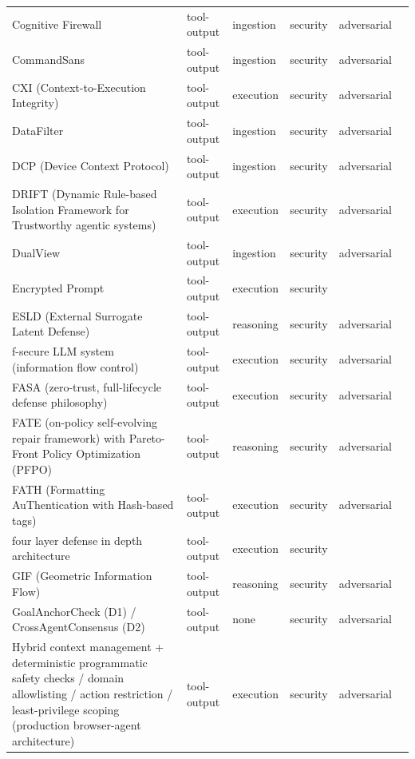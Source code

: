 \begin{longtable}{@{}p{}lllll@{}}
Cognitive Firewall & tool-output & ingestion & security & adversarial & \cite{lan-2026-cognitive} \\
CommandSans & tool-output & ingestion & security & adversarial & \cite{das-2025-commandsans} \\
CXI (Context-to-Execution Integrity) & tool-output & execution & security & adversarial & \cite{santosgrueiro-2026-contexttoexecution} \\
DataFilter & tool-output & ingestion & security & adversarial & \cite{wang-2025-defending} \\
DCP (Device Context Protocol) & tool-output & ingestion & security & adversarial & \cite{yang-2026-device} \\
DRIFT (Dynamic Rule-based Isolation Framework for Trustworthy agentic systems) & tool-output & execution & security & adversarial & \cite{li-2025-drift} \\
DualView & tool-output & ingestion & security & adversarial & \cite{kim-2026-dualview} \\
Encrypted Prompt & tool-output & execution & security &  & \cite{chan-2025-encrypted} \\
ESLD (External Surrogate Latent Defense) & tool-output & reasoning & security & adversarial & \cite{narendra-2026-esld} \\
f-secure LLM system (information flow control) & tool-output & execution & security & adversarial & \cite{wu-2024-systemlevel} \\
FASA (zero-trust, full-lifecycle defense philosophy) & tool-output & execution & security & adversarial & \cite{ying-2026-uncovering} \\
FATE (on-policy self-evolving repair framework) with Pareto-Front Policy Optimization (PFPO) & tool-output & reasoning & security & adversarial & \cite{yin-2026-onpolicy} \\
FATH (Formatting AuThentication with Hash-based tags) & tool-output & execution & security & adversarial & \cite{wang-2024-fath} \\
four layer defense in depth architecture & tool-output & execution & security &  & \cite{maiti-2026-caging} \\
GIF (Geometric Information Flow) & tool-output & reasoning & security & adversarial & \cite{storek-2026-gif} \\
GoalAnchorCheck (D1) / CrossAgentConsensus (D2) & tool-output & none & security & adversarial & \cite{wang-2026-planflip} \\
Hybrid context management + deterministic programmatic safety checks / domain allowlisting / action restriction / least-privilege scoping (production browser-agent architecture) & tool-output & execution & security & adversarial & \cite{vardanyan-2025-building} \\

\end{longtable}
